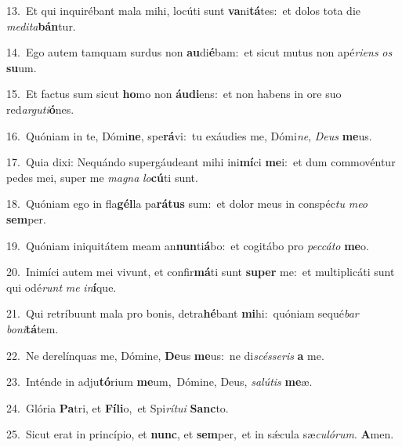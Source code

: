 {\numbfont\textcolor{\numbcolor}{13.}}~Et qui inquirébant mala mihi, locúti sunt \textbf{va}\-ni\-\textbf{tá}\-tes:~\star et dolos tota die \textit{me}\-\textit{di}\textit{ta}\textbf{bán}tur.\par
{\numbfont\textcolor{\numbcolor}{14.}}~Ego autem tamquam surdus non \textbf{au}\-di\-\textbf{é}\-bam:~\star et sicut mutus non apé\-\textit{ri}\-\textit{ens} \textit{os} \textbf{su}\-um.\par
{\numbfont\textcolor{\numbcolor}{15.}}~Et factus sum sicut \textbf{ho}\-mo non \textbf{áu}\-\textbf{di}ens:~\star et non habens in ore suo red\-\textit{ar}\-\textit{gu}\textit{ti}\textbf{ó}nes.\par
{\numbfont\textcolor{\numbcolor}{16.}}~Quóniam in te, Dómi\-\textbf{ne}\-, spe\-\textbf{rá}\-vi:~\star tu exáudies me, Dómi\-\textit{ne}\-, \textit{De}\-\textit{us} \textbf{me}\-us.\par
{\numbfont\textcolor{\numbcolor}{17.}}~Quia dixi: Nequándo supergáudeant mihi ini\-\textbf{mí}\-ci \textbf{me}\-i:~\star et dum commovéntur pedes mei, super me \textit{ma}\-\textit{gna} \textit{lo}\-\textbf{cú}ti sunt.\par
{\numbfont\textcolor{\numbcolor}{18.}}~Quóniam ego in fla\-\textbf{gél}\-la pa\-\textbf{rá}\-\textbf{tus} sum:~\star et dolor meus in conspéc\textit{tu} \textit{me}\-\textit{o} \textbf{sem}\-per.\par
{\numbfont\textcolor{\numbcolor}{19.}}~Quóniam iniquitátem meam an\-\textbf{nun}\-ti\-\textbf{á}\-bo:~\star et cogitábo pro \textit{pec}\-\textit{cá}\textit{to} \textbf{me}\-o.\par
{\numbfont\textcolor{\numbcolor}{20.}}~Inimíci autem mei vivunt, et confir\-\textbf{má}\-ti sunt \textbf{su}\-\textbf{per} me:~\star et multiplicáti sunt qui odé\textit{runt} \textit{me} \textit{in}\-\textbf{í}que.\par
{\numbfont\textcolor{\numbcolor}{21.}}~Qui retríbuunt mala pro bonis, detra\-\textbf{hé}\-bant \textbf{mi}\-hi:~\star quóniam sequé\textit{bar} \textit{bo}\-\textit{ni}\textbf{tá}tem.\par
{\numbfont\textcolor{\numbcolor}{22.}}~Ne derelínquas me, Dómine, \textbf{De}\-us \textbf{me}\-us:~\star ne di\-\textit{scés}\-\textit{se}\textit{ris} \textbf{a} me.\par
{\numbfont\textcolor{\numbcolor}{23.}}~Inténde in adju\-\textbf{tó}\-rium \textbf{me}\-um,~\star Dómine, Deus, \textit{sa}\-\textit{lú}\textit{tis} \textbf{me}\-æ.\par
{\numbfont\textcolor{\numbcolor}{24.}}~Glória \textbf{Pa}\-tri, et \textbf{Fí}\-\textbf{li}o,~\star et Spi\-\textit{rí}\-\textit{tu}\textit{i} \textbf{Sanc}\-to.\par
{\numbfont\textcolor{\numbcolor}{25.}}~Sicut erat in princípio, et \textbf{nunc}\-, et \textbf{sem}\-per,~\star et in sǽcula sæ\-\textit{cu}\-\textit{ló}\textit{rum}. \textbf{A}\-men.\par

